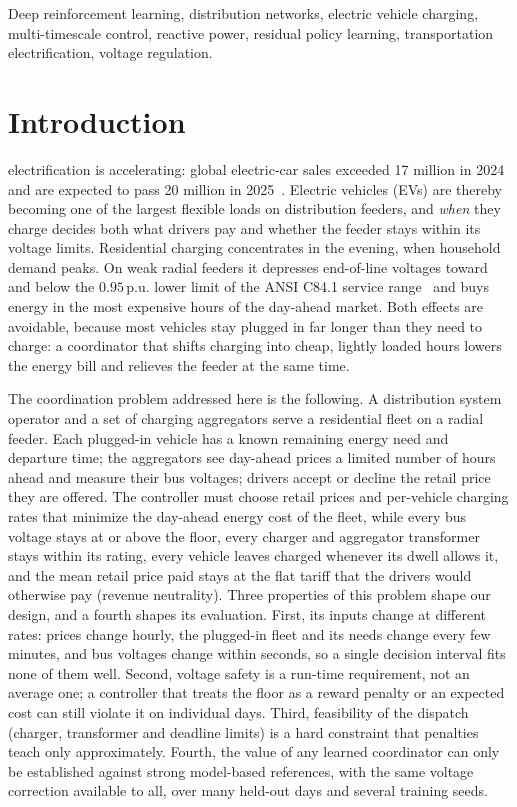 \documentclass[journal]{IEEEtran}
\newcommand{\pu}{\,\mathrm{p.u.}}
\begin{document}
\begin{IEEEkeywords}
Deep reinforcement learning, distribution networks, electric vehicle charging,
multi-timescale control, reactive power, residual policy learning,
transportation electrification, voltage regulation.
\end{IEEEkeywords}

\section{Introduction}
 electrification is accelerating: global
electric-car sales exceeded 17 million in 2024 and are expected to pass 20
million in 2025~\cite{iea2025}. Electric vehicles (EVs) are thereby becoming
one of the largest flexible loads on distribution feeders, and \emph{when} they
charge decides both what drivers pay and whether the feeder stays within its
voltage limits. Residential charging concentrates in the evening, when
household demand peaks. On weak radial feeders it depresses end-of-line
voltages toward and below the $0.95\pu$ lower limit of the ANSI C84.1 service
range~\cite{ansi_c84,clement2010} and buys energy in the most expensive hours
of the day-ahead market. Both effects are avoidable, because most vehicles
stay plugged in far longer than they need to charge: a coordinator that
shifts charging into cheap, lightly loaded hours lowers the energy bill and
relieves the feeder at the same time.

The coordination problem addressed here is the following. A distribution
system operator and a set of charging aggregators serve a residential fleet
on a radial feeder. Each plugged-in vehicle has a known remaining energy need
and departure time; the aggregators see day-ahead prices a limited number of
hours ahead and measure their bus voltages; drivers accept or decline the
retail price they are offered. The controller must choose retail prices and
per-vehicle charging rates that minimize the day-ahead energy cost of the
fleet, while every bus voltage stays at or above the floor, every charger and
aggregator transformer stays within its rating, every vehicle leaves charged
whenever its dwell allows it, and the mean retail price paid stays at the flat
tariff that the drivers would otherwise pay (revenue neutrality). Three
properties of this problem shape our design, and a fourth shapes its
evaluation. First, its inputs change at
different rates: prices change hourly, the plugged-in fleet and its needs
change every few minutes, and bus voltages change within seconds, so a single
decision interval fits none of them well. Second, voltage safety is a
run-time requirement, not an average one; a controller that treats the floor
as a reward penalty or an expected cost can still violate it on individual
days. Third, feasibility of the dispatch (charger, transformer and deadline
limits) is a hard constraint that penalties teach only approximately. Fourth,
the value of any learned coordinator can only be established against strong
model-based references, with the same voltage correction available to all,
over many held-out days and several training seeds.
\end{document}
